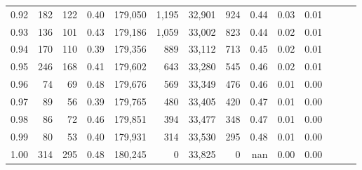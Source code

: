\begin{tabular}{rrrrrrrrrrrrrr}
0.92 &    182 &  122 &  0.40 &  179,050 &    1,195 &  32,901 &     924 &  0.44 &  0.03 &      0.01 \\
0.93 &    136 &  101 &  0.43 &  179,186 &    1,059 &  33,002 &     823 &  0.44 &  0.02 &      0.01 \\
0.94 &    170 &  110 &  0.39 &  179,356 &      889 &  33,112 &     713 &  0.45 &  0.02 &      0.01 \\
0.95 &    246 &  168 &  0.41 &  179,602 &      643 &  33,280 &     545 &  0.46 &  0.02 &      0.01 \\
0.96 &     74 &   69 &  0.48 &  179,676 &      569 &  33,349 &     476 &  0.46 &  0.01 &      0.00 \\
0.97 &     89 &   56 &  0.39 &  179,765 &      480 &  33,405 &     420 &  0.47 &  0.01 &      0.00 \\
0.98 &     86 &   72 &  0.46 &  179,851 &      394 &  33,477 &     348 &  0.47 &  0.01 &      0.00 \\
0.99 &     80 &   53 &  0.40 &  179,931 &      314 &  33,530 &     295 &  0.48 &  0.01 &      0.00 \\
1.00 &    314 &  295 &  0.48 &  180,245 &        0 &  33,825 &       0 &   nan &  0.00 &      0.00 \\
\bottomrule
\end{tabular}
